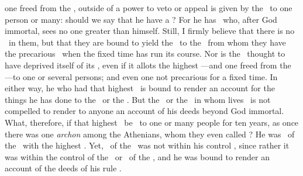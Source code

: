 \documentclass[12pt,twoside]{memoir}
\begin{document}
one freed from the \leges, outside of
a power to veto or appeal is given by the \populus\ to one person or
many: should we say that he  have a \iusmaiestatis?
For he has \maiestas\ who, after God immortal, sees no one greater
than himself.  Still, I firmly believe  that there is
no \maiestas\ in them, but that they are bound to yield
 the \imperium\ to the \populus\ from whom they have
the precarious \potestas\ when the fixed time has run its
course. %
Nor is the \populus\ thought to have deprived itself of its \potestas,
even if it allots the highest \imperium---and one freed from the
\leges---to one or several persons; and even one not precarious
for a fixed time. In either way, he who had that highest \imperium\
is bound to render an account for the things he has done
to the \princeps\ or the \populus.
But the \princeps\ or the \populus\ in whom lives 
\maiestas\ is not compelled to render to anyone an account of his
\additio{or its} deeds beyond God immortal.
%
What, therefore, if that highest \imperium\ be \concederi\ to one or
many people for ten years, as once there was one \emph{archon} among
the Athenians, whom they even called \Iudex? He was \praeesse\ of the
\respublica\ with the highest \potestas. Yet, \maiestas\ of the
\respublica\ was not within his control , since
rather it was within the control of the \curator\ or \procurator\ of
the \populus, and he was bound to render an account of the deeds of
his rule \platin{imperii gesti}.



\end{document}
